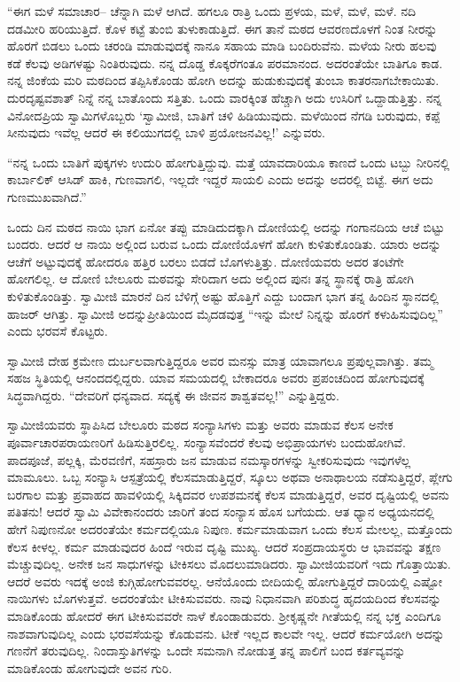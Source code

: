 \vskip 2pt

 “ಈಗ ಮಳೆ ಸಮಾಚಾರ– ಚೆನ್ನಾಗಿ ಮಳೆ ಆಗಿದೆ. ಹಗಲೂ ರಾತ್ರಿ ಒಂದು ಪ್ರಳಯ, ಮಳೆ, ಮಳೆ, ಮಳೆ. ನದಿ ದಡಮೀರಿ ಹರಿಯುತ್ತಿದೆ. ಕೊಳ ಕಟ್ಟೆ ತುಂಬಿ ತುಳುಕಾಡುತ್ತಿದೆ. ಈಗ ತಾನೆ ಮಠದ ಆವರಣದೊಳಗೆ ನಿಂತ ನೀರನ್ನು ಹೊರಗೆ ಬಿಡಲು ಒಂದು ಚರಂಡಿ ಮಾಡುವುದಕ್ಕೆ ನಾನೂ ಸಹಾಯ ಮಾಡಿ ಬಂದಿರುವೆನು. ಮಳೆಯ ನೀರು ಹಲವು ಕಡೆ ಕೆಲವು ಅಡಿಗಳಷ್ಟು ನಿಂತಿರುವುದು. ನನ್ನ ದೊಡ್ಡ ಕೊಕ್ಕರೆಗಂತೂ ಪರಮಾನಂದ. ಅದರಂತೆಯೇ ಬಾತಿಗೂ ಕಾಡ. ನನ್ನ ಜಿಂಕೆಯ ಮರಿ ಮಠದಿಂದ ತಪ್ಪಿಸಿಕೊಂಡು ಹೋಗಿ ಅದನ್ನು ಹುಡುಕುವುದಕ್ಕೆ ತುಂಬಾ ಕಾತರನಾಗಬೇಕಾಯಿತು. ದುರದೃಷ್ಟವಶಾತ್ ನಿನ್ನೆ ನನ್ನ ಬಾತೊಂದು ಸತ್ತಿತು. ಒಂದು ವಾರಕ್ಕಿಂತ ಹೆಚ್ಚಾಗಿ ಅದು ಉಸಿರಿಗೆ ಒದ್ದಾಡುತ್ತಿತ್ತು. ನನ್ನ ವಿನೋದಪ್ರಿಯ ಸ್ವಾಮಿಗಳೊಬ್ಬರು ‘ಸ್ವಾಮೀಜಿ, ಬಾತಿಗೆ ಚಳಿ ಹಿಡಿಯುವುದು. ಮಳೆಯಿಂದ ನೆಗಡಿ ಬರುವುದು, ಕಪ್ಪೆ ಸೀನುವುದು ಇವೆಲ್ಲ ಆದರೆ ಈ ಕಲಿಯುಗದಲ್ಲಿ ಬಾಳಿ ಪ್ರಯೋಜನವಿಲ್ಲ!’ ಎನ್ನುವರು.

 “ನನ್ನ ಒಂದು ಬಾತಿಗೆ ಪುಕ್ಕಗಳು ಉದುರಿ ಹೋಗುತ್ತಿದ್ದುವು. ಮತ್ತೆ ಯಾವದಾರಿಯೂ ಕಾಣದೆ ಒಂದು ಟಬ್ಬು ನೀರಿನಲ್ಲಿ ಕಾರ್ಬಾಲಿಕ್ ಆಸಿಡ್ ಹಾಕಿ, ಗುಣವಾಗಲಿ, ಇಲ್ಲದೇ ಇದ್ದರೆ ಸಾಯಲಿ ಎಂದು ಅದನ್ನು ಅದರಲ್ಲಿ ಬಿಟ್ಟೆ. ಈಗ ಅದು ಗುಣಮುಖವಾಗಿದೆ.”

 ಒಂದು ದಿನ ಮಠದ ನಾಯಿ ಭಾಗ ಏನೋ ತಪ್ಪು ಮಾಡಿದುದಕ್ಕಾಗಿ ದೋಣಿಯಲ್ಲಿ ಅದನ್ನು ಗಂಗಾನದಿಯ ಆಚೆ ಬಿಟ್ಟು ಬಂದರು. ಆದರೆ ಆ ನಾಯಿ ಅಲ್ಲಿಂದ ಬರುವ ಒಂದು ದೋಣಿಯೊಳಗೆ ಹೋಗಿ ಕುಳಿತುಕೊಂಡಿತು. ಯಾರು ಅದನ್ನು ಆಚೆಗೆ ಅಟ್ಟುವುದಕ್ಕೆ ಹೋದರೂ ಹತ್ತಿರ ಬರಲು ಬಿಡದೆ ಬೊಗಳುತ್ತಿತ್ತು. ದೋಣಿಯವರು ಅದರ ತಂಟೆಗೇ ಹೋಗಲಿಲ್ಲ. ಆ ದೋಣಿ ಬೇಲೂರು ಮಠವನ್ನು ಸೇರಿದಾಗ ಅದು ಅಲ್ಲಿಂದ ಪುನಃ ತನ್ನ ಸ್ಥಾನಕ್ಕೆ ರಾತ್ರಿ ಹೋಗಿ ಕುಳಿತುಕೊಂಡಿತ್ತು. ಸ್ವಾಮೀಜಿ ಮಾರನೆ ದಿನ ಬೆಳಿಗ್ಗೆ ಅಷ್ಟು ಹೊತ್ತಿಗೆ ಎದ್ದು ಬಂದಾಗ ಭಾಗ ತನ್ನ ಹಿಂದಿನ ಸ್ಥಾನದಲ್ಲಿ ಹಾಜರ್ ಆಗಿತ್ತು. ಸ್ವಾಮೀಜಿ ಅದನ್ನು\break ಪ್ರೀತಿಯಿಂದ ಮೈದಡವುತ್ತ “ಇನ್ನು ಮೇಲೆ ನಿನ್ನನ್ನು ಹೊರಗೆ ಕಳುಹಿಸುವುದಿಲ್ಲ” ಎಂದು ಭರವಸೆ ಕೊಟ್ಟರು. 

 ಸ್ವಾಮೀಜಿ ದೇಹ ಕ್ರಮೇಣ ದುರ್ಬಲವಾಗುತ್ತಿದ್ದರೂ ಅವರ ಮನಸ್ಸು ಮಾತ್ರ ಯಾವಾಗಲೂ ಪ್ರಪುಲ್ಲವಾಗಿತ್ತು. ತಮ್ಮ ಸಹಜ ಸ್ಥಿತಿಯಲ್ಲಿ ಆನಂದದಲ್ಲಿದ್ದರು. ಯಾವ ಸಮಯದಲ್ಲಿ ಬೇಕಾದರೂ ಅವರು ಪ್ರಪಂಚದಿಂದ ಹೋಗುವುದಕ್ಕೆ ಸಿದ್ಧವಾಗಿದ್ದರು. “ದೇವರಿಗೆ ಧನ್ಯವಾದ. ಸದ್ಯಕ್ಕೆ ಈ ಜೀವನ ಶಾಶ್ವತವಲ್ಲ!” ಎನ್ನುತ್ತಿದ್ದರು. 

 ಸ್ವಾಮೀಜಿಯವರು ಸ್ಥಾಪಿಸಿದ ಬೇಲೂರು ಮಠದ ಸಂನ್ಯಾಸಿಗಳು ಮತ್ತು ಅವರು ಮಾಡುವ ಕೆಲಸ ಅನೇಕ ಪೂರ್ವಾಚಾರಪರಾಯಣರಿಗೆ ಹಿಡಿಸುತ್ತಿರಲಿಲ್ಲ. ಸಂನ್ಯಾಸವೆಂದರೆ ಕೆಲವು ಅಭಿಪ್ರಾಯಗಳು ಬಂದುಹೋಗಿವೆ. ಪಾದಪೂಜೆ, ಪಲ್ಲಕ್ಕಿ, ಮೆರವಣಿಗೆ, ಸಹಸ್ರಾರು ಜನ ಮಾಡುವ ನಮಸ್ಕಾರಗಳನ್ನು ಸ್ವೀಕರಿಸುವುದು ಇವುಗಳೆಲ್ಲ ಮಾಮೂಲು. ಒಬ್ಬ ಸಂನ್ಯಾಸಿ ಆಸ್ಪತ್ರೆಯಲ್ಲಿ ಕೆಲಸಮಾಡುತ್ತಿದ್ದರೆ, ಸ್ಕೂಲು ಅಥವಾ ಅನಾಥಾಲಯ ನಡೆಸುತ್ತಿದ್ದರೆ, ಪ್ಲೇಗು ಬರಗಾಲ ಮತ್ತು ಪ್ರವಾಹದ ಹಾವಳಿಯಲ್ಲಿ ಸಿಕ್ಕಿದವರ ಉಪಶಮನಕ್ಕೆ ಕೆಲಸ ಮಾಡುತ್ತಿದ್ದರೆ, ಅವರ ದೃಷ್ಟಿಯಲ್ಲಿ ಅವನು ಪತಿತನು! ಆದರೆ ಸ್ವಾಮಿ ವಿವೇಕಾನಂದರು ಜಾರಿಗೆ ತಂದ ಸಂನ್ಯಾಸ ಹೊಸ ಬಗೆಯದು. ಆತ ಧ್ಯಾನ ಅಧ್ಯಯನದಲ್ಲಿ ಹೇಗೆ ನಿಪುಣನೋ ಅದರಂತೆಯೇ ಕರ್ಮದಲ್ಲಿಯೂ ನಿಪುಣ. ಕರ್ಮಮಾಡುವಾಗ ಒಂದು ಕೆಲಸ ಮೇಲಲ್ಲ, ಮತ್ತೊಂದು ಕೆಲಸ ಕೀಳಲ್ಲ. ಕರ್ಮ ಮಾಡುವುದರ ಹಿಂದೆ ಇರುವ ದೃಷ್ಟಿ ಮುಖ್ಯ. ಆದರೆ ಸಂಪ್ರದಾಯಸ್ಥರು ಆ ಭಾವವನ್ನು ತಕ್ಷಣ ಮೆಚ್ಚುವುದಿಲ್ಲ. ಅನೇಕ ಜನ ಸಾಧುಗಳನ್ನು ಟೀಕಿಸಲು ಮೊದಲುಮಾಡಿದರು. ಸ್ವಾಮೀಜಿಯವರಿಗೆ ಇದು ಗೊತ್ತಾಯಿತು. ಆದರೆ ಅವರು ಇದಕ್ಕೆ ಅಂಜಿ ಕುಗ್ಗಿಹೋಗುವವರಲ್ಲ. ಆನೆಯೊಂದು ಬೀದಿಯಲ್ಲಿ ಹೋಗುತ್ತಿದ್ದರೆ ದಾರಿಯಲ್ಲಿ ಎಷ್ಟೋ ನಾಯಿಗಳು ಬೊಗಳುತ್ತವೆ. ಅದರಂತೆಯೇ ಟೀಕಿಸುವವರು. ನಾವು ನಿಧಾನವಾಗಿ ಪರಿಶುದ್ಧ ಹೃದಯದಿಂದ ಕೆಲಸವನ್ನು ಮಾಡಿಕೊಂಡು ಹೋದರೆ ಈಗ ಟೀಕಿಸುವವರೇ ನಾಳೆ ಕೊಂಡಾಡುವರು. ಶ‍್ರೀಕೃಷ್ಣನೇ ಗೀತೆಯಲ್ಲಿ ನನ್ನ ಭಕ್ತ ಎಂದಿಗೂ ನಾಶವಾಗುವುದಿಲ್ಲ ಎಂದು ಭರವಸೆಯನ್ನು ಕೊಡುವನು. ಟೀಕೆ ಇಲ್ಲದ ಕಾಲವೇ ಇಲ್ಲ. ಆದರೆ ಕರ್ಮಯೋಗಿ ಅದನ್ನು ಗಣನೆಗೆ ತರುವುದಿಲ್ಲ. ನಿಂದಾಸ್ತುತಿಗಳನ್ನು ಒಂದೇ ಸಮನಾಗಿ ನೋಡುತ್ತ ತನ್ನ ಪಾಲಿಗೆ ಬಂದ ಕರ್ತವ್ಯವನ್ನು ಮಾಡಿಕೊಂಡು ಹೋಗುವುದೇ ಅವನ ಗುರಿ. 

